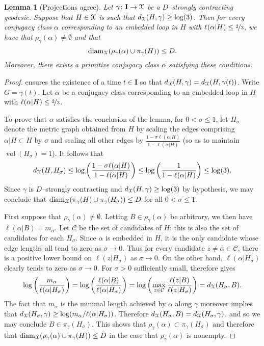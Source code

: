 \documentclass[letterpaper,fleqn]{article}
\theoremstyle{plain}
\newtheorem{lemma}[theorem]{Lemma}
\theoremstyle{definition}
\DeclareMathOperator{\diam}{diam}
\newcommand{\os}{{\EuScript X}} %
\newcommand{\len}{\ell}  %
\newcommand{\cp}{\pi} %
\newcommand{\minlen}{m}  %
\newcommand{\minpts}{\rho} %
\DeclareMathOperator{\vol}{vol} %
\renewcommand{\diam}{\mathrm{diam}}
\newcommand{\I}{\mathbf{I}}
\begin{document}
\begin{lemma}[Projections agree]
\label{lem:projections_agree}
Let $\gamma\colon \I\to \os$ be a $D$--strongly contracting geodesic. Suppose that $H\in \os$ is such that $d_\os(H,\gamma)\ge \log(3)$. Then for every conjugacy class $\alpha$ corresponding to an embedded loop in $H$ with $\len(\alpha\vert H) \le \nicefrac{2}{3}$, we have that $\minpts_\gamma(\alpha)\neq\emptyset$ and that 
\[\diam_\os(\minpts_\gamma(\alpha)\cup\cp_\gamma(H))\le D.\]
Moreover, there exists a primitive conjugacy class $\alpha$ satisfying these conditions.
\end{lemma}
\begin{proof}
 ensures the existence of a time $t\in \I$ so that $d_\os(H,\gamma) = d_\os(H,\gamma(t))$.  Write $G= \gamma(t)$. Let $\alpha$ be a conjugacy class corresponding to an embedded loop in $H$ with $\len(\alpha\vert H)\le \nicefrac{2}{3}$. 

To prove that $\alpha$ satisfies the conclusion of the lemma, for $0 < \sigma \leq 1$, let $H_\sigma$ denote the metric graph obtained from $H$ by scaling the edges comprising $\alpha\vert H\subset H$ by $\sigma$ and scaling all other edges by $\frac{1-\sigma\len(\alpha\vert H)}{1-\len(\alpha\vert H)}$ (so as to maintain $\vol(H_\sigma) = 1$). It follows that
\[d_\os(H,H_\sigma) \le \log\left(\frac{1- \sigma \len(\alpha\vert H)}{1 - \len(\alpha\vert H)}\right) \le \log\left(\frac{1}{1 - \len(\alpha\vert H)}\right) \le \log(3).\]
Since $\gamma$ is $D$--strongly contracting and $d_\os(H,\gamma)\ge \log(3)$ by hypothesis, we may conclude that $\diam_\os(\cp_\gamma(H)\cup\cp_\gamma(H_\sigma))\le D$ for all $0 < \sigma \le 1$.

First suppose that $\minpts_\gamma(\alpha)\neq\emptyset$. Letting $B\in \minpts_\gamma(\alpha)$ be arbitrary, we then have  $\len(\alpha\vert B) = \minlen_\alpha$. Let $\mathcal{C}$ be the set of candidates of $H$; this is also the set of candidates for each $H_\sigma$. Since $\alpha$ is embedded in $H$, it is the only candidate whose edge lengths all tend to zero as $\sigma\to 0$. Thus for every candidate $z\neq \alpha\in \mathcal{C}$, there is a positive lower bound on $\len(z\vert H_\sigma)$ as $\sigma\to 0$. On the other hand, $\len(\alpha\vert H_\sigma)$ clearly tends to zero as $\sigma \to 0$. 
For $\sigma >0$ sufficiently small,  therefore gives
\[\log\left(\frac{\minlen_\alpha}{\len(\alpha\vert H_\sigma)}\right) = \log\left(\frac{\len(\alpha\vert B)}{\len(\alpha\vert H_\sigma)}\right) = \log\left(\max_{z\in \mathcal{C}} \frac{\len(z \vert B)}{\len(z\vert H_\sigma)}\right) = d_\os(H_\sigma,B).\]
The fact that $\minlen_\alpha$ is the minimal length achieved by $\alpha$ along $\gamma$ moreover implies that $d_\os(H_\sigma,\gamma) \ge \log(\minlen_\alpha / \ell(\alpha\vert H_\sigma))$. Therefore $d_\os(H_\sigma, B) = d_\os(H_\sigma,\gamma)$, and so we may conclude $B\in \cp_\gamma(H_\sigma)$. This shows that $\minpts_\gamma(\alpha)\subset \cp_\gamma(H_\sigma)$ and therefore that $\diam_\os(\minpts_\gamma(\alpha)\cup\cp_\gamma(H))\le D$  in the case that $\minpts_\gamma(\alpha)$ is nonempty.


\end{proof}
\end{document}
